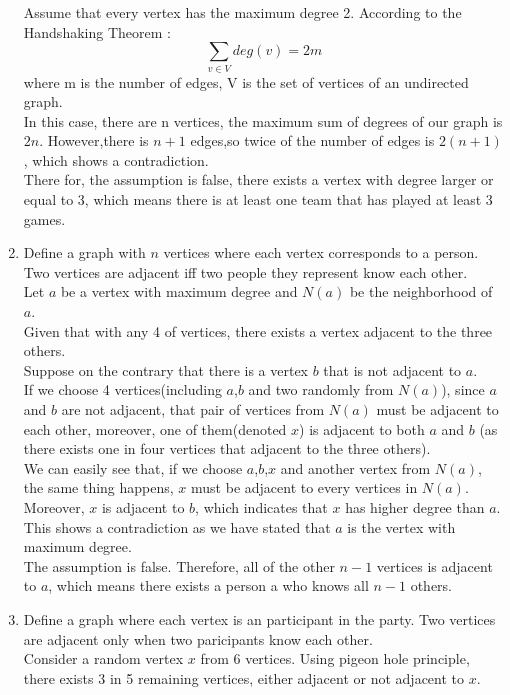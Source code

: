 \documentclass[a4paper]{article}
\begin{document}
\begin{enumerate}
	    Assume that every vertex has the maximum degree 2. According to the Handshaking Theorem :
	    \begin{equation*}
	        \sum_{v \in V} deg(v) = 2m
	    \end{equation*}
	    where m is the number of edges, V is the set of vertices of an undirected graph. \\
	    In this case, there are n vertices, the maximum sum of degrees of our graph is $2n$. However,there is $n+1$ edges,so twice of the number of edges is $2(n+1)$, which shows a contradiction. \\
	    There for, the assumption is false, there exists a vertex with degree larger or equal to 3, which means there is at least one team that has played at least 3 games.
	    \item Define a graph with $n$ vertices where each vertex corresponds to a person. Two vertices are adjacent iff two people they represent know each other.\\
	    Let $a$ be a vertex with maximum degree and $N(a)$ be the neighborhood of $a$. \\
	    Given that with any 4 of vertices, there exists a vertex adjacent to the three others. \\
	    Suppose on the contrary that there is a vertex $b$ that is not adjacent to $a$. \\
	    If we choose 4 vertices(including $a$,$b$ and two randomly from $N(a)$), since $a$ and $b$ are not adjacent, that pair of vertices from $N(a)$ must be adjacent to each other, moreover, one of them(denoted $x$) is adjacent to both $a$ and $b$ (as there exists one in four vertices that adjacent to the three others). \\
	    We can easily see that, if we choose $a$,$b$,$x$ and another vertex from $N(a)$, the same thing happens, $x$ must be adjacent to every vertices in $N(a)$. Moreover, $x$ is adjacent to $b$, which indicates that $x$ has higher degree than $a$. This shows a contradiction as we have stated that $a$ is the vertex with maximum degree. \\
	    The assumption is false. Therefore, all of the other $n-1$ vertices is adjacent to $a$, which means there exists a person a who knows all $n-1$ others.
	    \item Define a graph where each vertex is an participant in the party. Two vertices are adjacent only when two paricipants know each other. \\
	    Consider a random vertex $x$ from 6 vertices. Using pigeon hole principle, there exists 3 in 5 remaining vertices, either adjacent or not adjacent to $x$. \\

\end{enumerate}
\end{document}
